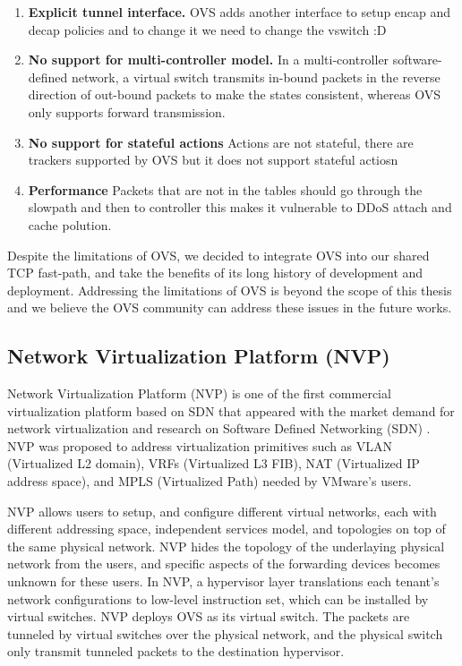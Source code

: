 \begin{enumerate}
    \item \textbf{Explicit tunnel interface.} OVS adds another interface to setup encap and 
    decap policies and to change it we need to change the vswitch :D %

    \item \textbf{No support for multi-controller model.} In a multi-controller 
    software-defined network, a virtual switch transmits in-bound packets in the reverse 
    direction of out-bound packets to make the states consistent, whereas OVS only supports forward transmission. 

    \item \textbf{No support for stateful actions} Actions are not stateful, there are 
    trackers supported by OVS but it does not support stateful actiosn %

    \item \textbf{Performance} Packets that are not in the tables should go through the 
    slowpath and then to controller this makes it vulnerable to DDoS attach and cache 
    polution.  %

\end{enumerate}

Despite the limitations of OVS, we decided to integrate OVS into our shared TCP fast-path,
and take the benefits of its long history of development and deployment. Addressing 
the limitations of OVS is beyond the scope of this thesis and we believe the OVS community can
address these issues in the future works. 

\subsection{Network Virtualization Platform (NVP)}
\label{nvp}
Network Virtualization Platform (NVP) is one of the first commercial virtualization 
platform based on SDN that appeared with the market demand for network virtualization
and research on Software Defined Networking (SDN) \cite{koponen2014network}. NVP was proposed 
to address virtualization primitives such as VLAN (Virtualized L2 domain), 
VRFs (Virtualized L3 FIB), NAT 
(Virtualized IP address space), and MPLS (Virtualized Path) needed by VMware's users.

NVP allows users to setup, and configure different virtual networks, each with
different addressing space, independent services model, and topologies
on top of the same physical network. NVP hides the topology of  the underlaying physical network
from the users, and specific aspects of the forwarding devices becomes unknown for these users. 
In NVP, a hypervisor layer translations each tenant's network configurations to 
low-level instruction set, which can be installed by virtual switches. NVP deploys OVS
as its virtual switch. The packets are tunneled by virtual switches over the physical network, and 
the physical switch only transmit tunneled packets to the destination hypervisor.


